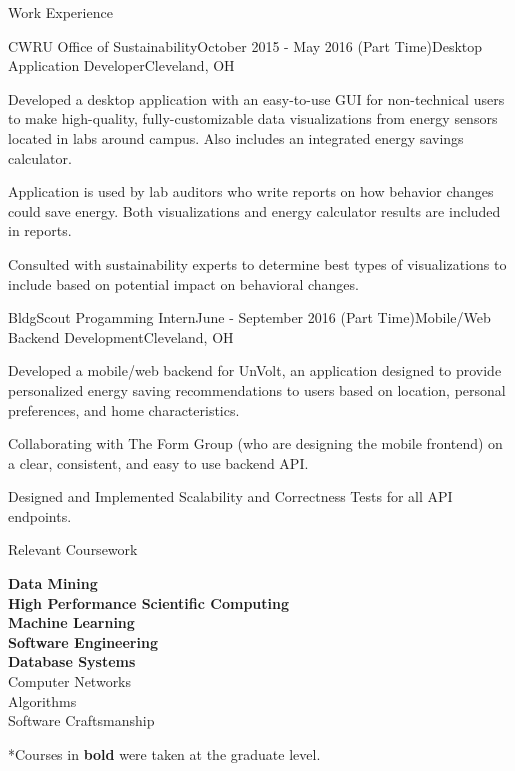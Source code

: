\documentclass{resume} %
\begin{document}
\begin{rSection}{Work Experience}
\begin{rSubsection}{CWRU Office of Sustainability}{October 2015 - May 2016 (Part Time)}{Desktop Application Developer}{Cleveland, OH}
\item Developed a desktop application with an easy-to-use GUI for non-technical users to make high-quality, fully-customizable data visualizations from energy sensors located in labs around campus. Also includes an integrated energy savings calculator.
\item Application is used by lab auditors who write reports on how behavior changes could save energy. Both visualizations and energy calculator results are included in reports.
\item Consulted with sustainability experts to determine best types of visualizations to include based on potential impact on behavioral changes.
\end{rSubsection}

\begin{rSubsection}{BldgScout Progamming Intern}{June - September 2016 (Part Time)}{Mobile/Web Backend Development}{Cleveland, OH}
\item Developed a mobile/web backend for UnVolt, an application designed to provide personalized energy saving recommendations to users based on location, personal preferences, and home characteristics.
\item Collaborating with The Form Group (who are designing the mobile frontend) on a clear, consistent, and easy to use backend API.
\item Designed and Implemented Scalability and Correctness Tests for all API endpoints.

\end{rSubsection}

\end{rSection}


\begin{rSection}{Relevant Coursework}
\begin{multicols}{2}[]
\textbf{Data Mining} \\
\textbf{High Performance Scientific Computing} \\
\textbf{Machine Learning} \\
\textbf{Software Engineering} \\ 
\textbf{Database Systems} \\
Computer Networks \\
Algorithms \\
Software Craftsmanship
\end{multicols}
\vspace{-1.0em}
*Courses in \textbf{bold} were taken at the graduate level.
\end{rSection}
\end{document}

